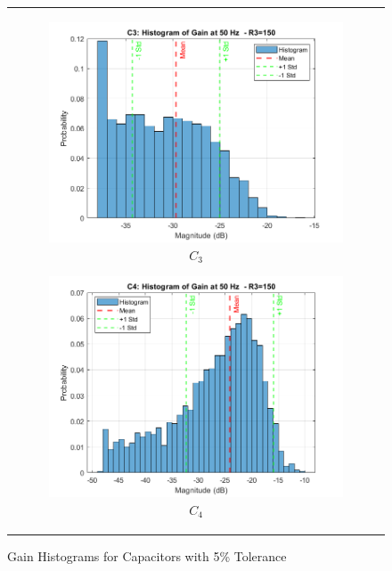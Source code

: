\documentclass[hidelinks,12pt]{article}
\begin{document}
\begin{figure}[!h]
{\begin{tabular}{c}
				\begin{subfigure}[h]{0.4\textwidth}
					\centering
					\includegraphics[width=\textwidth]{figures/r3=150/c3.png}
					\caption{$C_3$}
				\end{subfigure}
				\hfill
				\begin{subfigure}[h]{0.4\textwidth}
					\centering
					\includegraphics[width=\textwidth]{figures/r3=150/c4.png}
					\caption{$C_4$}
				\end{subfigure}
			\end{tabular}
		}
		\caption{Gain Histograms for Capacitors with 5\% Tolerance}
		\label{fig:R3_150_capacitors_5_percent}
	\end{figure}
	
\end{document}
